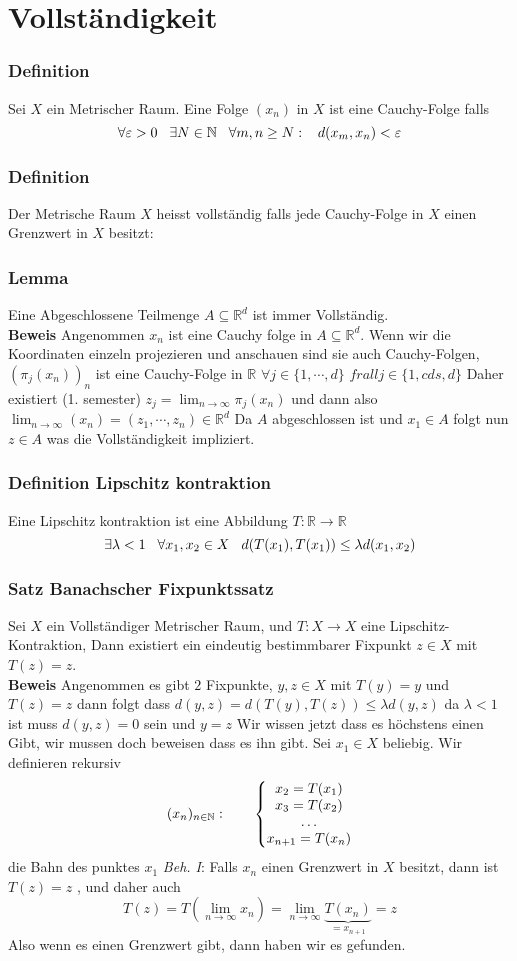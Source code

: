 \documentclass{article}
\newcommand{\mspc}{\hspace{0.7cm}}
\newcommand{\smspc}{\hspace{0.3cm}}
\newcommand{\satz}[1]{\subsubsection*{Satz {#1}}}
\newcommand{\beweis}{\\\textbf{Beweis }}
\newcommand{\lemma}[1]{\subsubsection*{Lemma {#1}}}
\newcommand{\definition}[1]{\subsubsection*{Definition {#1}}}
\begin{document}
\section*{Vollständigkeit}
\definition{} Sei $X$ ein Metrischer Raum. Eine Folge $(x_n)$ in $X$ ist eine Cauchy-Folge falls \[\forall \varepsilon >0 \smspc \exists N\in \mathbb{N}\smspc \forall m,n \ge N:\smspc d(x_m,x_n)<\varepsilon\]
\definition{} Der Metrische Raum $X$ heisst vollständig falls jede Cauchy-Folge in $X$ einen Grenzwert in $X$ besitzt:
\lemma{} Eine Abgeschlossene Teilmenge $A \subseteq \mathbb{R}^d$ ist immer Vollständig.
\beweis Angenommen $x_n$ ist eine Cauchy folge in $A\subseteq \mathbb{R}^d$. Wenn wir die Koordinaten einzeln projezieren und anschauen sind sie auch Cauchy-Folgen, $(\pi_j(x_n))_n$ ist eine Cauchy-Folge in $\mathbb{R}$ $\forall j\in\lbrace 1,\cdots , d\rbrace$ $frall j\in\lbrace 1,cds , d\rbrace$ Daher existiert (1. semester) $z_j=\lim_{n\rightarrow\infty}\pi_j(x_n)$  und dann also $\lim_{n\rightarrow\infty}(x_n)=(z_1,\cdots,z_n)\in \mathbb{R}^d$ Da $A$ abgeschlossen ist 
und $x_1\in A$ folgt nun $z\in A$ was die Vollständigkeit impliziert.
\definition{Lipschitz kontraktion}
Eine Lipschitz kontraktion ist eine Abbildung $T:\mathbb{R}\rightarrow \mathbb{R}$
\[\exists \lambda<1\smspc \forall x_1,x_2\in X\smspc d(T(x_1), T(x_1))\le \lambda d(x_1,x_2)\]
\satz{Banachscher Fixpunktssatz}
Sei $X$ ein Vollständiger Metrischer Raum, und $T:X \rightarrow X$ eine Lipschitz-Kontraktion, Dann existiert ein eindeutig bestimmbarer Fixpunkt $z\in X$ mit $T(z)=z$.
\beweis Angenommen es gibt $2$ Fixpunkte, $y,z\in X$ mit $T(y)=y$ und $T(z)=z$ dann folgt dass $d(y,z)=d(T(y),T(z))\le \lambda d(y,z)$ da $\lambda <1$ ist muss $d(y,z)=0$ sein und $y=z$
Wir wissen jetzt dass es höchstens einen Gibt, wir mussen doch beweisen dass es ihn gibt.
\newline Sei $x_1\in X$ beliebig. Wir definieren rekursiv \[(x_n)_{n\in\mathbb{N}}:\mspc\left\lbrace\begin{matrix}x_2=T(x_1)\\x_3=T(x_2)\\\hdots\\x_{n+1}=T(x_n)\end{matrix}\right.\]
die Bahn des punktes $x_1$ \newline \textit{Beh. I}: Falls $x_n$ einen Grenzwert in $X$ besitzt, dann ist $T(z)=z$ , und daher auch \[T(z)=T(\lim_{n\rightarrow\infty}x_n)=\lim_{n\rightarrow\infty}\underset{=x_{n+1}}{\underbrace{T(x_n)}}=z\]
Also wenn es einen Grenzwert gibt, dann haben wir es gefunden.\newline
\end{document}

